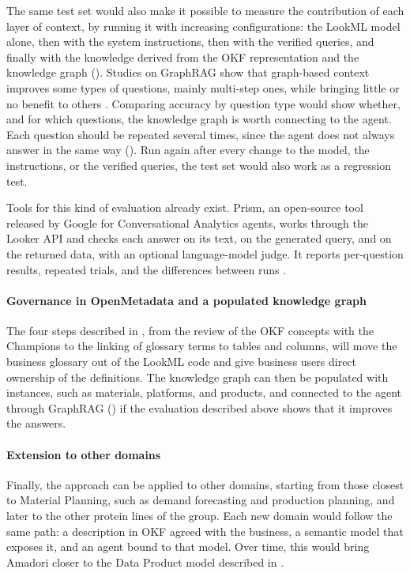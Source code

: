 The same test set would also make it possible to measure the contribution of each layer of context, by running it with increasing configurations: the LookML model alone, then with the system instructions, then with the verified queries, and finally with the knowledge derived from the OKF representation and the knowledge graph (). Studies on GraphRAG show that graph-based context improves some types of questions, mainly multi-step ones, while bringing little or no benefit to others \cite{xiang2025graphrag}. Comparing accuracy by question type would show whether, and for which questions, the knowledge graph is worth connecting to the agent. Each question should be repeated several times, since the agent does not always answer in the same way (). Run again after every change to the model, the instructions, or the verified queries, the test set would also work as a regression test.

Tools for this kind of evaluation already exist. Prism, an open-source tool released by Google for Conversational Analytics agents, works through the Looker API and checks each answer on its text, on the generated query, and on the returned data, with an optional language-model judge. It reports per-question results, repeated trials, and the differences between runs \cite{googlecloudprism2026}.

\paragraph{Governance in OpenMetadata and a populated knowledge graph}
The four steps described in , from the review of the OKF concepts with the Champions to the linking of glossary terms to tables and columns, will move the business glossary out of the LookML code and give business users direct ownership of the definitions. The knowledge graph can then be populated with instances, such as materials, platforms, and products, and connected to the agent through GraphRAG () if the evaluation described above shows that it improves the answers.

\paragraph{Extension to other domains}
Finally, the approach can be applied to other domains, starting from those closest to Material Planning, such as demand forecasting and production planning, and later to the other protein lines of the group. Each new domain would follow the same path: a description in OKF agreed with the business, a semantic model that exposes it, and an agent bound to that model. Over time, this would bring Amadori closer to the Data Product model described in .

